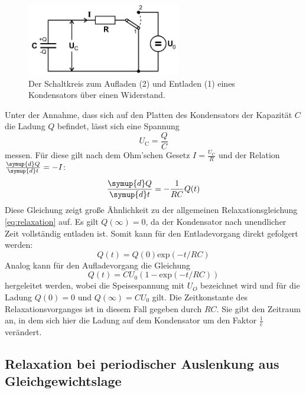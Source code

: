     \begin{figure}[H]
        \centering
        \includegraphics[width=0.6\textwidth]{bilder/Auflade_und_entlade.PNG}
        \caption{Der Schaltkreis zum Aufladen (2) und Entladen (1) eines Kondensators über einen Widerstand.\cite{anleitung}}
        \label{fig:Auf_Entladen}
    \end{figure}

    \noindent
    Unter der Annahme, dass sich auf den Platten des Kondensators der Kapazität $C$ die Ladung $Q$ befindet, lässt sich eine Spannung 
    \begin{equation*}
        U_{\text{C}} = \frac{Q}{C}
    \end{equation*}
    messen. Für diese gilt nach dem Ohm'schen Gesetz $I = \frac{U_{\text{C}}}{R}$ und der Relation $\frac{\symup{d}Q}{\symup{d}t} = -I$:
    \begin{equation*}
        \frac{\symup{d}Q}{\symup{d}t}  = - \frac{1}{RC} Q(t)
    \end{equation*}
    Diese Gleichung zeigt große Ähnlichkeit zu der allgemeinen Relaxationsgleichung \eqref{eq:relaxation} auf. Es gilt $Q(\infty) = 0$, da der Kondensator nach 
    unendlicher Zeit vollständig entladen ist. Somit kann für den Entladevorgang direkt gefolgert werden:
    \begin{equation*}
        Q(t) = Q(0) \text{exp}(-t/RC)
    \end{equation*}
    Analog kann für den Aufladevorgang die Gleichung
    \begin{equation*}
        Q(t) = CU_0(1- \text{exp}(-t/RC))
    \end{equation*}
    hergeleitet werden, wobei die Speisespannung mit $U_O$ bezeichnet wird und für die Ladung $Q(0)= 0 $ und $Q(\infty) = CU_0 $ gilt.
    Die Zeitkonstante des Relaxationsvorganges ist in diesem Fall gegeben durch $RC$. Sie gibt den Zeitraum an, in dem sich hier die Ladung auf dem Kondensator 
    um den Faktor $\frac{1}{e}$ verändert.

\subsection{Relaxation bei periodischer Auslenkung aus Gleichgewichtslage}

